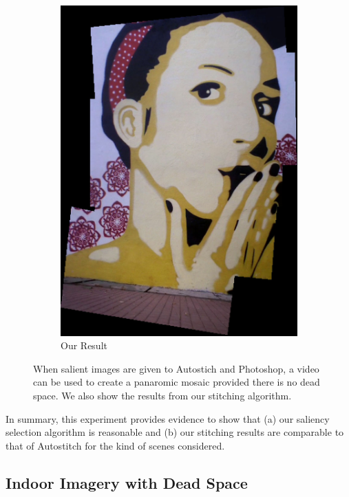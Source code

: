 \begin{figure}
\begin{subfigure}[b]{0.3\textwidth}
\includegraphics[width=\linewidth]{figures/sac3/our_result.jpg}
\caption{Our Result}
\end{subfigure}
\caption{When salient images are given to Autostich and Photoshop, a
  video can be used to create a panaromic mosaic provided there is no
  dead space. We also show the results from our stitching algorithm.}
\label{fig:results_sac3}
\end{figure}

In summary, this experiment provides evidence to show that (a) our
saliency selection algorithm is reasonable and (b) our stitching
results are comparable to that of Autostitch for the kind of scenes
considered.

\subsection{Indoor Imagery with Dead Space} 

